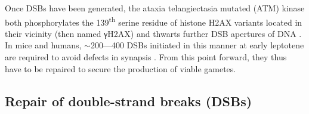 Once DSBs have been generated, the ataxia telangiectasia mutated (ATM) kinase both phosphorylates the 139\textsuperscript{th} serine residue of histone H2AX variants located in their vicinity (then named \textgreek{γ}H2AX) \citep{rogakou1998dna,burma2001atm} and thwarts further DSB apertures of DNA \citep{lange2011atm,lukaszewicz2018control}.\\

In mice and humans, ${\sim}$200—400 DSBs initiated in this manner at early leptotene are required to avoid defects in synapsis \citep{kauppi2013numerical,smagulova2013suppression}.
From this point forward, they thus have to be repaired to secure the production of viable gametes.







\subsection{Repair of double-strand breaks (DSBs)}
\label{chap2:DSB-repair}

